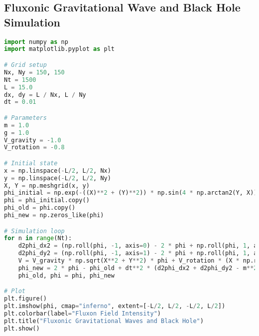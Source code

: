 \documentclass{article}
\begin{document}
\subsection{Fluxonic Gravitational Wave and Black Hole Simulation}
\begin{lstlisting}[language=Python, caption=Fluxonic Gravitational Wave Simulation, label=lst:gravity]
import numpy as np
import matplotlib.pyplot as plt

# Grid setup
Nx, Ny = 150, 150
Nt = 1500
L = 15.0
dx, dy = L / Nx, L / Ny
dt = 0.01

# Parameters
m = 1.0
g = 1.0
V_gravity = -1.0
V_rotation = -0.8

# Initial state
x = np.linspace(-L/2, L/2, Nx)
y = np.linspace(-L/2, L/2, Ny)
X, Y = np.meshgrid(x, y)
phi_initial = np.exp(-((X)**2 + (Y)**2)) * np.sin(4 * np.arctan2(Y, X))
phi = phi_initial.copy()
phi_old = phi.copy()
phi_new = np.zeros_like(phi)

# Simulation loop
for n in range(Nt):
    d2phi_dx2 = (np.roll(phi, -1, axis=0) - 2 * phi + np.roll(phi, 1, axis=0)) / dx**2
    d2phi_dy2 = (np.roll(phi, -1, axis=1) - 2 * phi + np.roll(phi, 1, axis=1)) / dy**2
    V = V_gravity * np.sqrt(X**2 + Y**2) * phi + V_rotation * (X * np.roll(phi, -1, axis=1) - Y * np.roll(phi, 1, axis=0))
    phi_new = 2 * phi - phi_old + dt**2 * (d2phi_dx2 + d2phi_dy2 - m**2 * phi - g * phi**3 + V)
    phi_old, phi = phi, phi_new

# Plot
plt.figure()
plt.imshow(phi, cmap="inferno", extent=[-L/2, L/2, -L/2, L/2])
plt.colorbar(label="Fluxon Field Intensity")
plt.title("Fluxonic Gravitational Waves and Black Hole")
plt.show()
\end{lstlisting}
\end{document}
